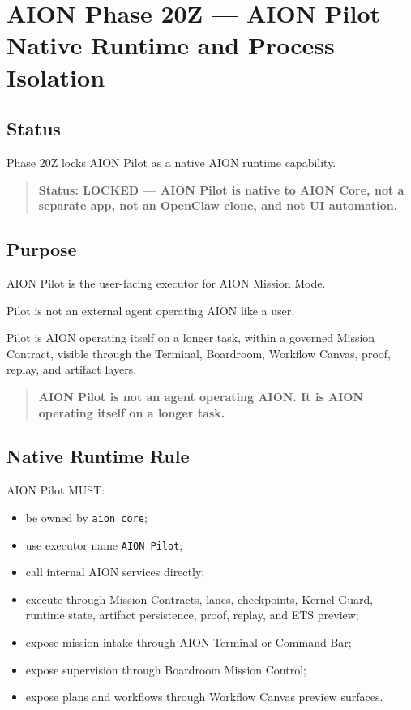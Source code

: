 \section{AION Phase 20Z --- AION Pilot Native Runtime and Process Isolation}
\label{sec:aion-phase20z-pilot-native-runtime}

\subsection{Status}

Phase 20Z locks AION Pilot as a native AION runtime capability.

\begin{quote}
\textbf{Status: LOCKED --- AION Pilot is native to AION Core, not a separate app, not an OpenClaw clone, and not UI automation.}
\end{quote}

\subsection{Purpose}

AION Pilot is the user-facing executor for AION Mission Mode.

Pilot is not an external agent operating AION like a user.

Pilot is AION operating itself on a longer task, within a governed Mission Contract, visible through the Terminal, Boardroom, Workflow Canvas, proof, replay, and artifact layers.

\begin{quote}
\textbf{AION Pilot is not an agent operating AION. It is AION operating itself on a longer task.}
\end{quote}

\subsection{Native Runtime Rule}

AION Pilot MUST:

\begin{itemize}
  \item be owned by \texttt{aion\_core};
  \item use executor name \texttt{AION Pilot};
  \item call internal AION services directly;
  \item execute through Mission Contracts, lanes, checkpoints, Kernel Guard, runtime state, artifact persistence, proof, replay, and ETS preview;
  \item expose mission intake through AION Terminal or Command Bar;
  \item expose supervision through Boardroom Mission Control;
  \item expose plans and workflows through Workflow Canvas preview surfaces.
\end{itemize}

